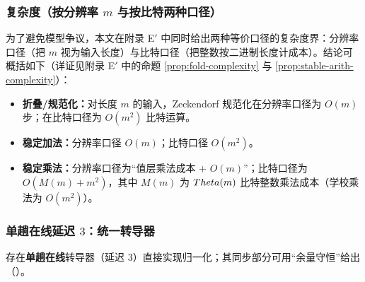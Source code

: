 \subsubsection{复杂度（按分辨率 \texorpdfstring{$m$}{m} 与按比特两种口径）}

为了避免模型争议，本文在附录 E$'$ 中同时给出两种等价口径的复杂度界：分辨率口径（把 $m$ 视为输入长度）与比特口径（把整数按二进制长度计成本）。结论可概括如下（详证见附录 E$'$ 中的命题 \ref{prop:fold-complexity} 与 \ref{prop:stable-arith-complexity}）：

\begin{itemize}
  \item \textbf{折叠/规范化：}对长度 $m$ 的输入，Zeckendorf 规范化在分辨率口径为 $O(m)$ 步；在比特口径为 $O(m^2)$ 比特运算。
  \item \textbf{稳定加法：}分辨率口径 $O(m)$；比特口径 $O(m^2)$。
  \item \textbf{稳定乘法：}分辨率口径为“值层乘法成本 + $O(m)$”；比特口径为 $O(M(m)+m^2)$，其中 $M(m)$ 为 $\\Theta(m)$ 比特整数乘法成本（学校乘法为 $O(m^2)$）。
\end{itemize}



\subsubsection{单趟在线延迟 \texorpdfstring{$3$}{3}：统一转导器}\label{subsec:online-delay}
存在\textbf{单趟在线}转导器（延迟 3）直接实现归一化；其同步部分可用“余量守恒”给出（\cite{Frougny1999OnlineAddition}）。

